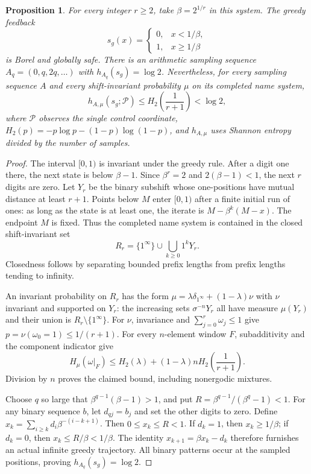 \documentclass[11pt,reqno]{amsart}
\numberwithin{equation}{section}
\newtheorem{proposition}[theorem]{Proposition}
\theoremstyle{definition}
\begin{document}
\begin{proposition}\label{prop:shannon-boundary}
For every integer $r\ge2$, take $\beta=2^{1/r}$ in this system.
The greedy feedback
\[
 s_g(x)=\begin{cases}0,&x<1/\beta,\\1,&x\ge1/\beta\end{cases}
\]
is Borel and globally safe. There is an arithmetic sampling
sequence $A_q=(0,q,2q,\ldots)$ with $h_{A_q}(s_g)=\log2$.
Nevertheless, for every sampling sequence $A$ and every
shift-invariant probability $\mu$ on its completed name system,
\[
 h_{A,\mu}(s_g;\mathcal P)\le
 H_2\left(\frac1{r+1}\right)<\log2,
\]
where $\mathcal P$ observes the single control coordinate,
$H_2(p)=-p\log p-(1-p)\log(1-p)$, and $h_{A,\mu}$ uses Shannon
entropy divided by the number of samples.
\end{proposition}
\begin{proof}
The interval $[0,1)$ is invariant under the greedy rule.
After a digit one there, the next state is below $\beta-1$.
Since $\beta^r=2$ and $2(\beta-1)<1$, the next $r$ digits
are zero. Let $Y_r$ be the binary subshift whose one-positions
have mutual distance at least $r+1$. Points below $M$ enter
$[0,1)$ after a finite initial run of ones: as long as the
state is at least one, the iterate is
$M-\beta^k(M-x)$. The endpoint $M$ is fixed. Thus the
completed name system is contained in the closed shift-invariant set
\[
 R_r=\{1^\infty\}\cup\bigcup_{k\ge0}1^kY_r.
\]
Closedness follows by separating bounded prefix lengths from
prefix lengths tending to infinity.

An invariant probability on $R_r$ has the form
$\mu=\lambda\delta_{1^\infty}+(1-\lambda)\nu$ with $\nu$
invariant and supported on $Y_r$: the increasing sets
$\sigma^{-n}Y_r$ all have measure $\mu(Y_r)$ and their union
is $R_r\setminus\{1^\infty\}$.
For $\nu$, invariance and $\sum_{j=0}^r\omega_j\le1$ give
$p=\nu(\omega_0=1)\le1/(r+1)$. For every $n$-element window $F$,
subadditivity and the component indicator give
\[
 H_\mu(\omega|_F)
 \le H_2(\lambda)+(1-\lambda)nH_2\left(\frac1{r+1}\right).
\]
Division by $n$ proves the claimed bound, including
nonergodic mixtures.

Choose $q$ so large that
$\beta^{q-1}(\beta-1)>1$, and put
$R=\beta^{q-1}/(\beta^q-1)<1$.
For any binary sequence $b$, let $d_{qj}=b_j$ and set the
other digits to zero. Define
$x_k=\sum_{i\ge k}d_i\beta^{-(i-k+1)}$.
Then $0\le x_k\le R<1$.
If $d_k=1$, then $x_k\ge1/\beta$; if $d_k=0$, then
$x_k\le R/\beta<1/\beta$.
The identity $x_{k+1}=\beta x_k-d_k$ therefore furnishes an
actual infinite greedy trajectory. All binary patterns occur
at the sampled positions, proving $h_{A_q}(s_g)=\log2$.
\end{proof}
\end{document}
